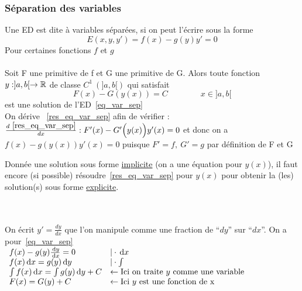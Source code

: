 \documentclass[12pt,a4paper]{article}
\begin{document}
\subsubsection{Séparation des variables}
Une ED est dite à variables séparées, si on peut l'écrire sous la forme 
\begin{equation}
	E(x,y,y') = f(x) - g(y)y' = 0
	\label{eq_var_sep}
\end{equation}
Pour certaines fonctions $f$ et $g$\\
\\
Soit F une primitive de f et G une primitive de G. Alors toute fonction $y : ]a,b[ \to \mathbb{R}$ de classe $C^1 \ (]a,b[)$ qui satisfait
\begin{equation}
	F(x) - G(y(x)) = C \qquad \qquad x\in ]a,b[
	\label{res_eq_var_sep}
\end{equation}
est une solution de l'ED~\eqref{eq_var_sep}\\
 On dérive ~\eqref{res_eq_var_sep} afin de vérifier : $\frac{d~\eqref{res_eq_var_sep}}{dx}:\\
 F'(x) - G'\Big(y(x)\Big)y'(x) = 0$ et donc on a $f(x) - g(y(x))y'(x) = 0$ puisque $F' = f,\ G'=g$ par définition de F et G
\begin{boite}
	 Donnée une solution sous forme \underline{implicite} \big(on a une équation pour $y(x)$\big), il faut encore (si possible) résoudre~\eqref{res_eq_var_sep} pour $y(x)$ pour obtenir la (les) solution(s) sous forme \underline{explicite}.
\end{boite}
${}$\\
\\
On écrit $y' = \frac{dy}{dx}$ que l'on manipule comme une fraction de \enquote{$dy$} sur \enquote{$dx$}. On a pour~\eqref{eq_var_sep}\\
$\begin{array}{ll}
	f(x) - g(y)\frac{\, \mathrm d y}{\, \mathrm d x} = 0 & |\cdot \, \mathrm d x\\	
	f(x)\, \mathrm d x = g(y)\, \mathrm d y  &|\cdot \int \\
	\int f(x) \, \mathrm d x = \int g(y) \, \mathrm d y + C & \leftarrow \text{Ici on traite $y$ comme une variable}\\
	F(x) = G(y) + C & \leftarrow \text{Ici $y$ est une fonction de x}
\end{array}$\\
\\
\end{document}
